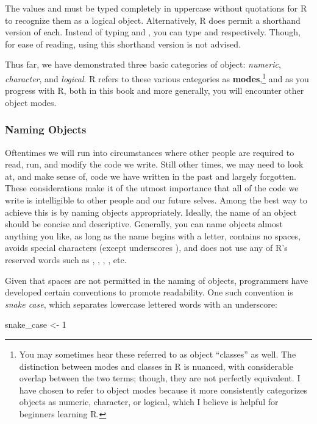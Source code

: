 The values  and  must be typed completely in uppercase without quotations for R to recognize them as a logical object.  Alternatively, R does permit a shorthand version of each.  Instead of typing  and , you can type  and  respectively.  Though, for ease of reading, using this shorthand version is not advised.

Thus far, we have demonstrated three basic categories of object: \textit{numeric}, \textit{character}, and \textit{logical}.  R refers to these various categories as \textbf{modes},\footnote{You may sometimes hear these referred to as object ``classes'' as well. The distinction between modes and classes in R is nuanced, with considerable overlap between the two terms; though, they are not perfectly equivalent. I have chosen to refer to object modes because it more consistently categorizes objects as numeric, character, or logical, which I believe is helpful for beginners learning R.} and as you progress with R, both in this book and more generally, you will encounter other object modes. 

\subsubsection{Naming Objects}
\label{sec:namingObjects}

Oftentimes we will run into circumstances where other people are required to read, run, and modify the code we write.  Still other times, we may need to look at, and make sense of, code we have written in the past and largely forgotten. These considerations make it of the utmost importance that all of the code we write is intelligible to other people and our future selves. Among the best way to achieve this is by naming objects appropriately. Ideally, the name of an object should be concise and descriptive. Generally, you can name objects almost anything you like, as long as the name begins with a letter, contains no spaces, avoids special characters (except underscores \R{\_}), and does not use any of R's \gls{reserved words} such as , , , , etc.

Given that spaces are not permitted in the naming of objects, programmers have developed certain conventions to promote readability. One such convention is \textit{snake case}, which separates lowercase lettered words with an underscore:

\begin{inR}
snake_case <- 1
\end{inR}
\medskip

